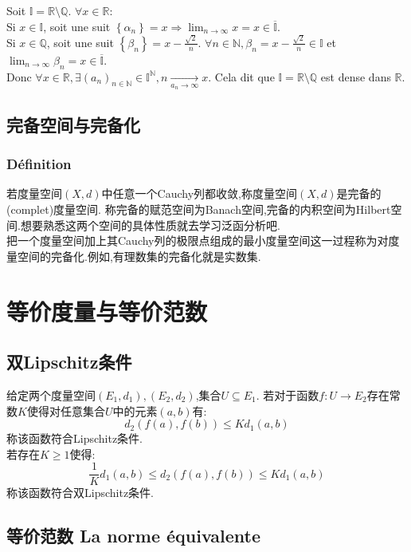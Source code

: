 \documentclass[12pt, a4paper, oneside]{ctexbook}
\newcommand{\R }{\mathbb{R}}%
\begin{document}
    Soit $\mathbb{I} =\R\setminus \mathbb{Q}$.
    $\forall x\in \R$:\\
    \indent
    Si $x\in \mathbb{I}$, 
    soit une suit $\left \{ \alpha_n \right \}=x \Rightarrow 
    \lim_{n \to \infty}x=x\in \mathbb{\overline{I}}$.\\
    \indent
    Si $x\in \mathbb{Q}$, 
    soit une suit $\left \{ \beta_n \right \}=x-\frac{\sqrt{2}}{n}$. 
    $\forall n\in \mathbb{N}, \beta_n=x-\frac{\sqrt{2}}{n}\in \mathbb{I}$ et 
    $\lim_{n \to \infty}\beta_n=x\in \mathbb{\overline{I}}$.\\
    \indent
    Donc $\forall x\in \R, \exists (a_n)_{n\in\mathbb{N}}\in \mathbb{I}^{\mathbb{N}}, n\xrightarrow[a_n\rightarrow\infty]{}x$. 
    Cela dit que $\mathbb{I}=\R\setminus \mathbb{Q}$ est dense dans $\R$.\\


  \subsection{完备空间与完备化 }
  \subsubsection{Définition}
  若度量空间$(X,d)$中任意一个Cauchy列都收敛,称度量空间$(X,d)$是完备的(complet)度量空间.
  称完备的赋范空间为Banach空间,完备的内积空间为Hilbert空间.想要熟悉这两个空间的具体性质就去学习泛函分析吧.\\

  把一个度量空间加上其Cauchy列的极限点组成的最小度量空间这一过程称为对度量空间的完备化.例如,有理数集的完备化就是实数集.

\section{等价度量与等价范数 }  \label{myref:normeq}
  \subsection{双Lipschitz条件 }
  给定两个度量空间$(E_1,d_1),(E_2,d_2)$,集合$U\subseteq E_1$.
  若对于函数$f:U\rightarrow E_2$存在常数$K$使得对任意集合$U$中的元素$(a,b)$有:
  $$
  d_2(f(a),f(b))\leq Kd_1(a,b)
  $$
  称该函数符合Lipschitz条件.\\
  若存在$K\ge 1$使得:
  $$
  \frac{1}{K}d_1(a,b)\leq d_2(f(a),f(b))\leq Kd_1(a,b)
  $$
  称该函数符合双Lipschitz条件.
  \subsection{等价范数 La norme équivalente}
\end{document}
